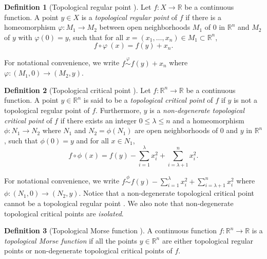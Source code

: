 \documentclass[11pt]{article}
\newcommand{\R}{\mathbb{R}}
\theoremstyle{plain}
\theoremstyle{definition}
\newtheorem{defi}{Definition}
\theoremstyle{remark}
\begin{document}
\begin{defi}[Topological regular point \citep{morse_topologically_1959}]
\label{def:topological_regular_point}
Let $f : X \to \R$ be a continuous function. A point $y \in X$ is a \emph{topological regular point} of $f$ if there is a homeomorphism $\varphi : M_1 \to M_2$ between open neighborhoods $M_1$ of $0$ in $\R^n$ and $M_2$ of $y$ with $\varphi(0) = y$, such that for all $x = (x_1, \ldots, x_n) \in M_1 \subset \R^n$, 
\begin{equation}\label{eq:topregpoint}
    f \circ \varphi \ (x) = f(y) + x_n.
\end{equation}
\end{defi}

For notational convenience, we write $f \overset{\varphi}{\sim} f(y) + x_n$ where $\varphi : (M_1, 0) \to (M_2, y)$.
 
\begin{defi}[Topological critical point \citep{morse_topologically_1959}]
\label{def:topological_critical_point}
Let $f : \R^n \to \R$ be a continuous function. 
A point $y \in \R^n$ is said to be a \emph{topological critical point} of $f$ if $y$ is not a topological regular point of $f$. Furthermore, $y$ is a \emph{non-degenerate topological critical point} of $f$ if there exists an integer $0 \leq \lambda \leq n$ and a homeomorphism $\phi : N_1 \to N_2$ where $N_1$ and $N_2 = \phi(N_1)$ are open neighborhoods of $0$ and $y$ in $\R^n$, such that $\phi(0) = y$ and for all $x \in N_1$,
\[f \circ \phi \,(x) = f(y) - \sum_{i = 1}^{\lambda} x_i^2 + \sum_{i = \lambda + 1}^n x_i^2.\]
\end{defi}
For notational convenience, we write $f \overset{\phi}{\sim} f(y) - \sum_{i = 1}^{\lambda} x_i^2 + \sum_{i = \lambda + 1}^n x_i^2$ where $\phi : (N_1, 0) \to (N_2, y)$.
Notice that a non-degenerate topological critical point cannot be a topological regular point \citep{morse_topologically_1959}. We also note that non-degenerate topological critical points are \textit{isolated}. 



\begin{defi}[Topological Morse function \citep{morse_topologically_1959}]
\label{def:topological_morse_function}
A continuous function $f : \R^n \to \R$ is a \emph{topological Morse function} if all the points $y \in \R^n$ are either topological regular points or non-degenerate topological critical points of $f$.
\end{defi}
\end{document}
